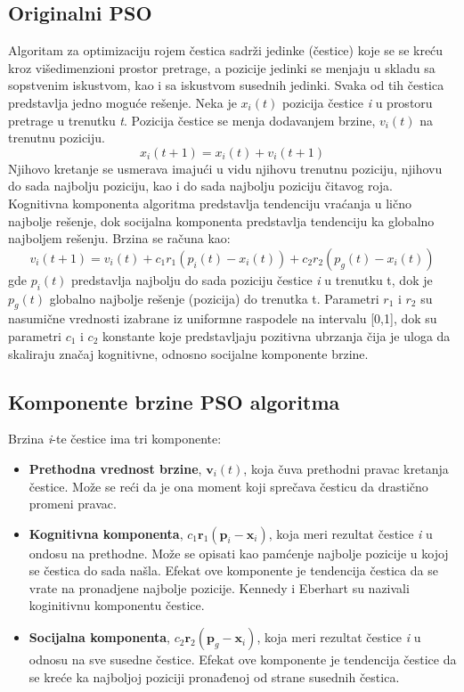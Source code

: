 \documentclass[a4paper]{article}
\begin{document}
\subsection{Originalni PSO}
Algoritam za optimizaciju rojem čestica sadrži jedinke (čestice) koje se se kreću kroz višedimenzioni prostor pretrage, a pozicije jedinki se menjaju u skladu sa sopstvenim iskustvom, kao i sa iskustvom susednih jedinki. Svaka od tih čestica predstavlja jedno moguće rešenje.
Neka je $x_i(t)$ pozicija čestice \textit{i} u prostoru pretrage u trenutku \textit{t}. Pozicija čestice se menja dodavanjem brzine, $v_i(t)$ na trenutnu poziciju. \[x_i(t+1) = x_i(t) + v_i(t+1) \]
Njihovo kretanje se usmerava imajući u vidu njihovu trenutnu poziciju, njihovu do sada najbolju poziciju, kao i do sada najbolju poziciju čitavog roja. Kognitivna komponenta algoritma predstavlja tendenciju vraćanja u lično najbolje rešenje, dok socijalna komponenta predstavlja tendenciju ka globalno najboljem rešenju. Brzina se računa kao: \[ v_i(t+1) = v_i(t) + c_1r_1(p_i(t) - x_i(t)) + c_2r_2(p_g(t) - x_i(t))\]
gde $p_i(t)$ predstavlja najbolju do sada poziciju čestice \textit{i} u trenutku t, dok je $p_g(t)$ globalno najbolje rešenje (pozicija) do trenutka t. Parametri $r_1$ i $r_2$ su nasumične vrednosti izabrane iz uniformne raspodele na intervalu [0,1], dok su parametri $c_1$ i $c_2$ konstante koje predstavljaju pozitivna ubrzanja čija je uloga da skaliraju značaj kognitivne, odnosno socijalne komponente brzine. 

\subsection{Komponente brzine PSO algoritma}
Brzina \textit{i}-te čestice ima tri komponente:\\
\begin{itemize}
    \item \textbf{Prethodna vrednost brzine}, $\textbf{v}_i(t)$, koja čuva prethodni pravac kretanja čestice. Može se reći da je ona moment koji sprečava česticu da drastično promeni pravac. 
    \item \textbf{Kognitivna komponenta}, $c_1\textbf{r}_1(\textbf{p}_i - \textbf{x}_i)$, koja meri rezultat čestice \textit{i} u ondosu na prethodne. Može se opisati kao pamćenje najbolje pozicije u kojoj se čestica do sada našla. Efekat ove komponente je tendencija čestica da se vrate na pronadjene najbolje pozicije. Kennedy i Eberhart su nazivali koginitivnu komponentu  čestice.
    \item \textbf{Socijalna komponenta}, $c_2\textbf{r}_2(\textbf{p}_g - \textbf{x}_i)$, koja meri rezultat čestice \textit{i} u odnosu na sve susedne čestice. Efekat ove komponente je tendencija čestice da se kreće ka najboljoj poziciji pronađenoj od strane susednih čestica.
\end{itemize}
\end{document}
